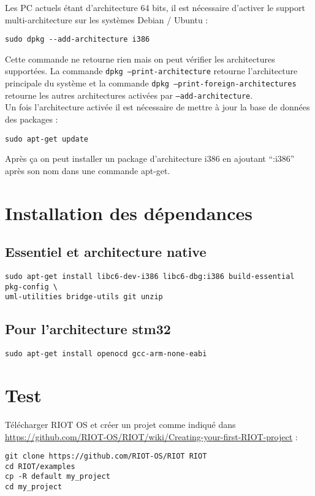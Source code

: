 \documentclass[a4paper,12pt, twoside]{article}
\begin{document}
Les PC actuels étant d'architecture 64 bits, il est nécessaire d'activer
le support multi-architecture sur les systèmes Debian / Ubuntu :
\begin{verbatim}
sudo dpkg --add-architecture i386
\end{verbatim}

Cette commande ne retourne rien mais on peut vérifier les architectures
supportées. La commande \texttt{dpkg ---print-architecture} retourne
l'architecture principale du système et la commande
\texttt{dpkg ---print-foreign-architectures} retourne les autres
architectures activées par \texttt{---add-architecture}.\\

Un fois l'architecture activée il est nécessaire de mettre à jour la
base de données des packages :
\begin{verbatim}
sudo apt-get update
\end{verbatim}

Après ça on peut installer un package d'architecture i386 en ajoutant
\enquote{:i386} après son nom dans une commande apt-get.

\section{Installation des dépendances}
\subsection{Essentiel et architecture native}
\begin{verbatim}
sudo apt-get install libc6-dev-i386 libc6-dbg:i386 build-essential pkg-config \
uml-utilities bridge-utils git unzip
\end{verbatim}
\subsection{Pour l'architecture stm32}
\begin{verbatim}
sudo apt-get install openocd gcc-arm-none-eabi
\end{verbatim}

\section{Test}
Télécharger RIOT OS et créer un projet comme indiqué dans 
\url{https://github.com/RIOT-OS/RIOT/wiki/Creating-your-first-RIOT-project} :
\begin{verbatim}
git clone https://github.com/RIOT-OS/RIOT RIOT
cd RIOT/examples
cp -R default my_project
cd my_project
\end{verbatim}
\end{document}
